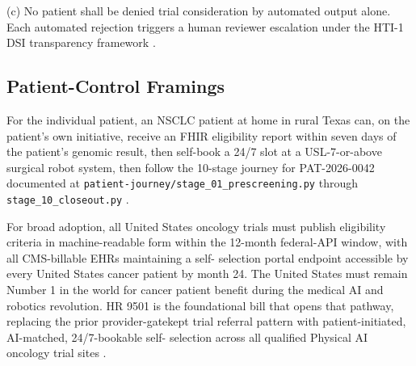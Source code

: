 (c) No patient shall be denied trial consideration by automated
output alone. Each automated rejection triggers a human reviewer
escalation under the HTI-1 DSI transparency framework
\cite{rank9_onc_hti1_2023, hti1_dsi_fact_sheet_2023}.

\subsection{Patient-Control Framings}

For the individual patient, an NSCLC patient at home in rural Texas
can, on the patient's own initiative, receive an FHIR eligibility
report within seven days of the patient's genomic result, then
self-book a 24/7 slot at a USL-7-or-above surgical robot system, then
follow the 10-stage journey for PAT-2026-0042 documented at
\texttt{patient-journey/stage\_01\_prescreening.py} through
\texttt{stage\_10\_closeout.py} \cite{kawchak_2026_19119939}.

For broad adoption, all United States oncology trials must publish
eligibility criteria in machine-readable form within the 12-month
federal-API window, with all CMS-billable EHRs maintaining a self-
selection portal endpoint accessible by every United States cancer
patient by month 24. The United States must remain Number 1 in the
world for cancer patient benefit during the medical AI and robotics
revolution. HR 9501 is the foundational bill that opens that
pathway, replacing the prior provider-gatekept trial referral
pattern with patient-initiated, AI-matched, 24/7-bookable self-
selection across all qualified Physical AI oncology trial sites
\cite{kawchak_2026_19994945, kawchak_2026_19119939,
rank2_clinical_treatment_act_2020}.

